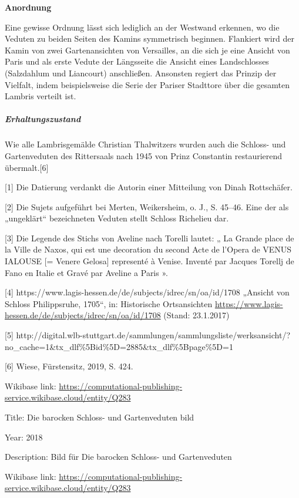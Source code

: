 \documentclass{book}
\begin{document}
\textbf{Anordnung}

Eine gewisse Ordnung lässt sich lediglich an der Westwand erkennen, wo
die Veduten zu beiden Seiten des Kamins symmetrisch beginnen. Flankiert
wird der Kamin von zwei Gartenansichten von Versailles, an die sich je
eine Ansicht von Paris und als erste Vedute der Längsseite die Ansicht
eines Landschlosses (Salzdahlum und Liancourt) anschließen. Ansonsten
regiert das Prinzip der Vielfalt, indem beispielsweise die Serie der
Pariser Stadttore über die gesamten Lambris verteilt ist.

\subparagraph{\texorpdfstring{\textbf{Erhaltungszustand}}{Erhaltungszustand}}\label{erhaltungszustand}

Wie alle Lambrisgemälde Christian Thalwitzers wurden auch die Schloss-
und Gartenveduten des Rittersaals nach 1945 von Prinz Constantin
restaurierend übermalt.{[}6{]}

{[}1{]} Die Datierung verdankt die Autorin einer Mitteilung von Dinah
Rottschäfer.

{[}2{]} Die Sujets aufgeführt bei Merten, Weikersheim, o. J., S. 45--46.
Eine der als „ungeklärt`` bezeichneten Veduten stellt Schloss Richelieu
dar.

{[}3{]} Die Legende des Stichs von Aveline nach Torelli lautet: „ La
Grande place de la Ville de Naxos, qui est une decoration du second Acte
de l'Opera de VENUS IALOUSE {[}= Venere Gelosa{]} representé à Venise.
Inventé par Jacques Torellj de Fano en Italie et Gravé par Aveline a
Paris ».

{[}4{]} https://www.lagis-hessen.de/de/subjects/idrec/sn/oa/id/1708
„Ansicht von Schloss Philippsruhe, 1705``, in: Historische Ortsansichten
\url{https://www.lagis-hessen.de/de/subjects/idrec/sn/oa/id/1708}
(Stand: 23.1.2017)

{[}5{]}
http://digital.wlb-stuttgart.de/sammlungen/sammlungsliste/werksansicht/?no\_cache=1\&tx\_dlf\%5Bid\%5D=2885\&tx\_dlf\%5Bpage\%5D=1

{[}6{]} Wiese, Fürstensitz, 2019, S. 424.

Wikibase link:
\url{https://computational-publishing-service.wikibase.cloud/entity/Q283}

Title: Die barocken Schloss- und Gartenveduten bild

Year: 2018

Description: Bild für Die barocken Schloss- und Gartenveduten

Wikibase link:
\url{https://computational-publishing-service.wikibase.cloud/entity/Q283}
\end{document}
